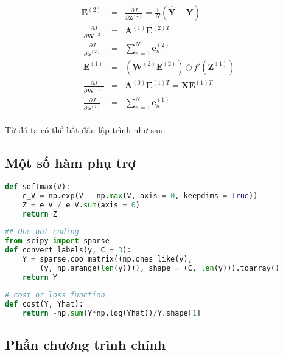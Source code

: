 \begin{equation*} 
\begin{eqnarray} 
\mathbf{E}^{(2)} &=& \frac{\partial J}{\partial \mathbf{Z}^{(2)}} =\frac{1}{N}(\mathbf{\hat{Y}} - \mathbf{Y}) \\\ 
\frac{\partial J}{\partial \mathbf{W}^{(2)}} &=& \mathbf{A}^{(1)}  \mathbf{E}^{(2)T} \\\ 
\frac{\partial J}{\partial \mathbf{b}^{(2)}} &=& \sum_{n=1}^N\mathbf{e}_n^{(2)} \\\ 
\mathbf{E}^{(1)} &=& \left(\mathbf{W}^{(2)}\mathbf{E}^{(2)}\right) \odot f'(\mathbf{Z}^{(1)}) \\\ 
\frac{\partial J}{\partial \mathbf{W}^{(1)}} &=& \mathbf{A}^{(0)}  \mathbf{E}^{(1)T} = \mathbf{X}\mathbf{E}^{(1)T}\\\ 
\frac{\partial J}{\partial \mathbf{b}^{(1)}} &=& \sum_{n=1}^N\mathbf{e}_n^{(1)} \\\ 
\end{eqnarray} 
\end{equation*} 
 
Từ đó ta có thể bắt đầu lập trình như sau: 
 
 
\subsection{Một số hàm phụ trợ}
 
\begin{lstlisting}[language=Python]
def softmax(V): 
    e_V = np.exp(V - np.max(V, axis = 0, keepdims = True)) 
    Z = e_V / e_V.sum(axis = 0) 
    return Z 
 
## One-hot coding 
from scipy import sparse 
def convert_labels(y, C = 3): 
    Y = sparse.coo_matrix((np.ones_like(y), 
        (y, np.arange(len(y)))), shape = (C, len(y))).toarray() 
    return Y 
 
# cost or loss function 
def cost(Y, Yhat): 
    return -np.sum(Y*np.log(Yhat))/Y.shape[1] 
\end{lstlisting}
 
 
 
\subsection{Phần chương trình chính}
 
